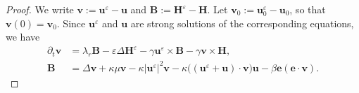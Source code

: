 \documentclass[10pt,a4paper]{amsart}
\newcommand{\bb}{\mathbb}
\newcommand{\bff}{\boldsymbol}
\newcommand{\ddt}{\frac{\mathrm{d}}{\mathrm{d}t}}
\newcommand{\inpro}[2]{\left\langle#1,#2\right\rangle}
\newcommand{\norm}[2]{\left\|{#1}\right\|_{#2}}
\begin{document}
\begin{proof}
We write $\bff{v}:= \bff{u}^\varepsilon-\bff{u}$ and $\bff{B}:= \bff{H}^\varepsilon-\bff{H}$. Let $\bff{v}_0:= \bff{u}_0^\varepsilon-\bff{u}_0$, so that $\bff{v}(0)=\bff{v}_0$. Since $\bff{u}^\varepsilon$ and $\bff{u}$ are strong solutions of the corresponding equations, we have
\begin{equation}\label{equ:diff v}
	\begin{aligned}
		\partial_t \bff{v}
		&=
		\lambda_r \bff{B}
		- \varepsilon \Delta \bff{H}^\varepsilon 
		- \gamma \bff{u}^\varepsilon \times \bff{B}
		- \gamma \bff{v}\times \bff{H},
		\\
		\bff{B}
		&=
		\Delta \bff{v}
		+ \kappa\mu \bff{v}
		-
		\kappa |\bff{u}^\varepsilon|^2 \bff{v}
		-
		\kappa \big( (\bff{u}^\varepsilon+\bff{u})\cdot \bff{v} \big) \bff{u}
		-
		\beta \bff{e}(\bff{e}\cdot \bff{v}).
	\end{aligned}
\end{equation}

\end{proof}
\end{document}
